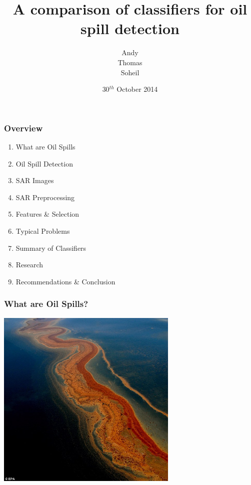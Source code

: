 \documentclass{beamer}
\title[Comparison of classifiers]{A comparison of classifiers for oil spill detection} %
\institute[TUDelft] %
{
Delft University of Technology \\ %
\medskip
}
\date{30$^{th}$ October 2014}
\author{Andy\\ Thomas\\ Soheil} %
\begin{document}
\begin{frame}
\titlepage %
\end{frame}

\begin{frame}
\frametitle{Overview} %
\begin{enumerate}
	\item What are Oil Spills
	\item Oil Spill Detection
	\item SAR Images
	\item SAR Preprocessing
	\item Features \& Selection	
	\item Typical Problems
	\item Summary of Classifiers 
	\item Research
	\item Recommendations \& Conclusion
\end{enumerate}

\end{frame}


\begin{frame}
\frametitle{What are Oil Spills?}

	\centering
	\includegraphics[width=0.65\textwidth]{./img/mex.jpg}	
    
\end{frame}

\end{document}
